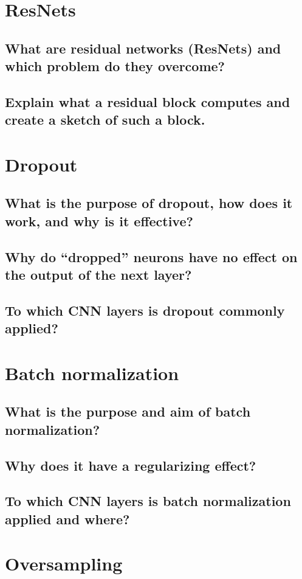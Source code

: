 \section{ResNets}
\subsection{What are residual networks (ResNets) and which problem do they overcome?}
\subsection{Explain what a residual block computes and create a sketch of such a block.}

\section{Dropout}
\subsection{What is the purpose of dropout, how does it work, and why is it effective?}
\subsection{Why do ``dropped'' neurons have no effect on the output of the next layer?}
\subsection{To which CNN layers is dropout commonly applied?}

\section{Batch normalization}
\subsection{What is the purpose and aim of batch normalization?}
\subsection{Why does it have a regularizing effect?}
\subsection{To which CNN layers is batch normalization applied and where?}

\section{Oversampling}
